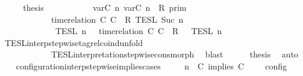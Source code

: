 \begin{isabellebody}
\ \ \isamarkupfalse%
\ \isamarkupfalse%
\ {\isacharquery}thesis\isanewline
\ \ \isamarkupfalse%
\ {\isacharminus}\isanewline
\ \ \ \ \isamarkupfalse%
\ {\isacartoucheopen}{\isasymlbrakk}\ {\isasymlfloor}{\isasymtau}\isactrlsub v\isactrlsub a\isactrlsub r{\isacharparenleft}C\ n{\isacharparenright}{\isacharcomma}\ {\isasymtau}\isactrlsub v\isactrlsub a\isactrlsub r{\isacharparenleft}C\ n{\isacharparenright}{\isasymrfloor}\ {\isasymin}\ R\ {\isasymrbrakk}\isactrlsub p\isactrlsub r\isactrlsub i\isactrlsub m\isanewline
\ \ \ \ \ \ \ \ \ \ {\isasyminter}\ {\isasymlbrakk}\ time{\isacharminus}relation\ {\isasymlfloor}C\ C\ {\isasymin}\ R\ {\isasymrbrakk}\isactrlsub T\isactrlsub E\isactrlsub S\isactrlsub L\isactrlbsup {\isasymge}\ Suc\ n\isactrlesup \isanewline
\ \ \ \ \ \ \ \ \ \ {\isasyminter}\ {\isasymlbrakk}{\isasymlbrakk}\ {\isasymPsi}\ {\isasymrbrakk}{\isasymrbrakk}\isactrlsub T\isactrlsub E\isactrlsub S\isactrlsub L\isactrlbsup {\isasymge}\ n\isactrlesup \ {\isacharequal}\ {\isasymlbrakk}{\isasymlbrakk}\ {\isacharparenleft}time{\isacharminus}relation\ {\isasymlfloor}C\ C\ {\isasymin}\ R{\isacharparenright}\ {\isacharhash}\ {\isasymPsi}\ {\isasymrbrakk}{\isasymrbrakk}\isactrlsub T\isactrlsub E\isactrlsub S\isactrlsub L\isactrlbsup {\isasymge}\ n\isactrlesup {\isacartoucheclose}\isanewline
\ \ \ \ \ \ \isamarkupfalse%
\ TESL{\isacharunderscore}interp{\isacharunderscore}stepwise{\isacharunderscore}tagrel{\isacharunderscore}coind{\isacharunderscore}unfold\isanewline
\ \ \ \ \ \ \ \ \ \ \ \ TESL{\isacharunderscore}interpretation{\isacharunderscore}stepwise{\isacharunderscore}cons{\isacharunderscore}morph\ \isamarkupfalse%
\ blast\isanewline
\ \ \ \ \isamarkupfalse%
\ {\isacharquery}thesis\ \isamarkupfalse%
\ auto\isanewline
\ \ \isamarkupfalse%
\isanewline
{}\isamarkupfalse%
%
\endisatagproof
{\isafoldproof}%
%
\isadelimproof
\isanewline
%
\endisadelimproof
\isanewline
{}\isamarkupfalse%
\ configuration{\isacharunderscore}interp{\isacharunderscore}stepwise{\isacharunderscore}implies{\isacharunderscore}cases{\isacharcolon}\isanewline
\ \ \ {\isacartoucheopen}{\isasymlbrakk}\ {\isasymGamma}{\isacharcomma}\ n\ {\isasymturnstile}\ {\isacharparenleft}{\isacharparenleft}C\ implies\ C\ {\isacharhash}\ {\isasymPsi}{\isacharparenright}\ {\isasymtriangleright}\ {\isasymPhi}\ {\isasymrbrakk}\isactrlsub c\isactrlsub o\isactrlsub n\isactrlsub f\isactrlsub i\isactrlsub g\isanewline

\end{isabellebody}
